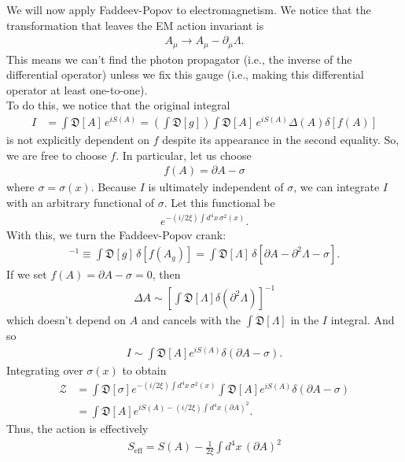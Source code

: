 \documentclass{book}
\theoremstyle{definition}
\newcommand{\p}{\partial}
\newcommand{\nn}{\nonumber}
\newcommand{\f}[2]{\frac{#1}{#2}}
\newcommand{\lp}{\left(}
\newcommand{\rp}{\right)}
\newcommand{\lb}{\left[}
\newcommand{\rb}{\right]}
\newcommand{\Z}{\mathcal{Z}}
\begin{document}
We will now apply Faddeev-Popov to electromagnetism. We notice that the transformation that leaves the EM action invariant is
\begin{align}
A_\mu \to A_\mu - \p_\mu \Lambda.
\end{align}
This means we can't find the photon propagator (i.e., the inverse of the differential operator) unless we fix this gauge (i.e., making this differential operator at least one-to-one).\\

To do this, we notice that the original integral
\begin{align}
 I &= \int \mathfrak{D}[A]\, e^{iS(A)} = \lp \int \mathfrak{D}[g]\rp \int \mathfrak{D}[A]\,e^{iS(A)}\Delta(A)\delta[f(A)]
\end{align}
is not explicitly dependent on $f$ despite its appearance in the second equality. So, we are free to choose $f$. In particular, let us choose
\begin{align}
f(A) = \p A - \sigma
\end{align}
where $\sigma = \sigma(x)$. Because $I$ is ultimately independent of $\sigma$, we can integrate $I$ with an arbitrary functional of $\sigma$. Let this functional be
\begin{align}
e^{-(i/2\xi)\int d^4x\,\sigma^2(x)}.
\end{align}
With this, we turn the Faddeev-Popov crank:
\begin{align}
[\Delta(A)]^{-1} \equiv \int \mathfrak{D}[g]\,\delta[f(A_g)] = \int\mathfrak{D}[\Lambda]\,\delta[\p A - \p^2 \Lambda - \sigma].
\end{align}
If we set $f(A) = \p A - \sigma = 0$, then 
\begin{align}
\Delta A \sim \lb\int \mathfrak{D}[\Lambda] \delta(\p^2\Lambda)\rb^{-1}
\end{align}
which doesn't depend on $A$ and cancels with the $\int\mathfrak{D}[\Lambda]$ in the $I$ integral. And so
\begin{align}
I \sim \int\mathfrak{D}[A]e^{iS(A)}\delta(\p A - \sigma).
\end{align}
Integrating over $\sigma(x)$ to obtain
\begin{align}
\Z &= \int\mathfrak{D}[\sigma] e^{-(i/2\xi)\int d^4x\, \sigma^2(x)}\int \mathfrak{D}[A]e^{iS(A)}\delta(\p A - \sigma)\nn\\
&= \int \mathfrak{D}[A]e^{iS(A) - (i/2\xi)\int d^4x\,(\p A)^2}.
\end{align}
Thus, the action is effectively
\begin{align}
S_\text{eff} = S(A) - \f{1}{2\xi}\int d^4x\, (\p A)^2
\end{align}
\end{document}
